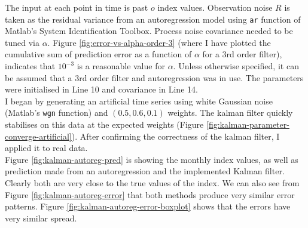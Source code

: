 \documentclass[11pt, fleqn]{article}
\begin{document}
The input at each point in time is past $o$ index values. Observation noise $R$ is taken as the residual variance from an autoregression model using \texttt{ar} function of Matlab's System Identification Toolbox. Process noise covariance needed to be tuned via $\alpha$. Figure \ref{fig:error-vs-alpha-order-3} (where I have plotted the cumulative sum of prediction error as a function of $\alpha$ for a 3rd order filter), indicates that $10^{-3}$ is a reasonable value for $\alpha$. Unless otherwise specified, it can be assumed that a 3rd order filter and autoregression was in use. The parameters were initialised in Line 10 and covariance in Line 14.\\

I began by generating an artificial time series using white Gaussian noise (Matlab's \texttt{wgn} function) and $(0.5, 0.6, 0.1)$ weights. The kalman filter quickly stabilises on this data at the expected weights (Figure \ref{fig:kalman-parameter-converge-artificial}). After confirming the correctness of the kalman filter, I applied it to real data.\\

Figure \ref{fig:kalman-autoreg-pred} is showing the monthly index values, as well as prediction made from an autoregression and the implemented Kalman filter. Clearly both are very close to the true values of the index. We can also see from Figure \ref{fig:kalman-autoreg-error} that both methods produce very similar error patterns. Figure \ref{fig:kalman-autoreg-error-boxplot} shows that the errors have very similar spread.\\
\end{document}
